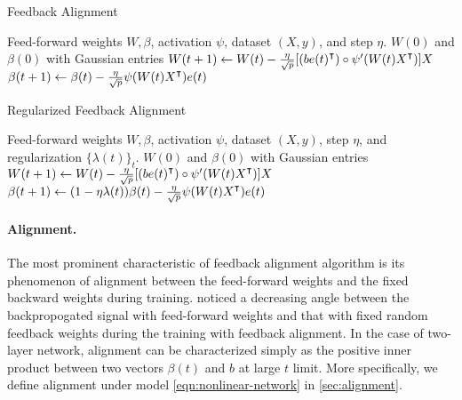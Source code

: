 \begin{minipage}{\textwidth}
\begin{algorithm}[H]
\centering
\caption{Feedback Alignment}\label{algo:fa}
    \begin{algorithmic}[1]
        \Require Feed-forward weights $W,\beta$, activation $\psi$, dataset $(X,y)$, and step $\eta$.
         $W(0)$ and $\beta(0)$ with Gaussian entries
            \State $W(t+1) \gets W(t) - \frac{\eta}{\sqrt p}[(b e(t)\transpose)\circ \psi'(W(t)X\transpose)] X$
            \State $\beta(t+1) \gets \beta(t) - \frac{\eta}{\sqrt p} \psi(W(t)X\transpose) e(t)$
        \EndWhile
    \end{algorithmic}    
\end{algorithm}%
\begin{algorithm}[H]
\centering
\caption{Regularized Feedback Alignment}\label{algo:fa-reg}
    \begin{algorithmic}[1]
        \Require Feed-forward weights $W,\beta$, activation $\psi$, dataset $(X,y)$, step $\eta$, and regularization $\{\lambda(t)\}_t$.
         $W(0)$ and $\beta(0)$ with Gaussian entries
            \State $W(t+1) \gets W(t) - \frac{\eta}{\sqrt p}[(b e(t)\transpose)\circ \psi'(W(t)X\transpose)] X$
            \State $\beta(t+1) \gets (1-\eta\lambda(t))\beta(t) - \frac{\eta}{\sqrt p} \psi(W(t)X\transpose) e(t)$
        \EndWhile
    \end{algorithmic}    
\end{algorithm}
\end{minipage}

\paragraph{Alignment.}

The most prominent characteristic of feedback alignment algorithm is its phenomenon of alignment between the feed-forward weights and the fixed backward weights during training. \citet{lillicrap2016random} noticed a decreasing angle between the backpropogated signal with feed-forward weights and that with fixed random feedback weights during the training with feedback alignment. In the case of two-layer network, alignment can be characterized simply as the positive inner product between two vectors $\beta(t)$ and $b$ at large $t$ limit. More specifically, we define alignment under model \eqref{eqn:nonlinear-network} in \cref{sec:alignment}.
